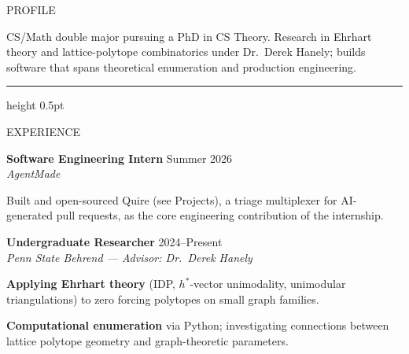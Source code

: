 \documentclass[10pt,letterpaper]{article}
\newcommand{\sechead}[1]{{\spacedboldfont\color{darktext}\fontsize{9.5}{11}\selectfont #1}\par\vspace{5pt}}
\newcommand{\subhead}[1]{{\bfseries\color{darktext}\fontsize{9.5}{12}\selectfont #1}}
\begin{document}
\newsavebox{\maincolbox}
\newlength{\maincolht}

\begin{lrbox}{\maincolbox}
\begin{minipage}[t]{5.55in}
\vspace{9pt}
\hspace{18pt}%
\begin{minipage}[t]{5.05in}

\sechead{PROFILE}
{\RaggedRight\fontsize{9}{13.5}\selectfont\color{darktext}
CS/Math double major pursuing a PhD in CS Theory. Research in Ehrhart theory and lattice-polytope combinatorics under Dr.\ Derek Hanely; builds software that spans theoretical enumeration and production engineering.\par}

\vspace{9pt}
{\color{lightrule}\hrule height 0.5pt}
\vspace{9pt}

\sechead{EXPERIENCE}

\subhead{Software Engineering Intern} \hfill {\fontsize{8.5}{10}\selectfont\color{midgray} Summer 2026}\\
{\fontsize{8.7}{11.5}\selectfont\color{midgray}\textit{AgentMade}}
\begin{tightlist}
\item {\fontsize{8.8}{12.3}\selectfont\color{darktext} Built and open-sourced Quire (see Projects), a triage multiplexer for AI-generated pull requests, as the core engineering contribution of the internship.}
\end{tightlist}

\vspace{10pt}
\subhead{Undergraduate Researcher} \hfill {\fontsize{8.5}{10}\selectfont\color{midgray} 2024--Present}\\
{\fontsize{8.7}{11.5}\selectfont\color{midgray}\textit{Penn State Behrend --- Advisor: Dr.\ Derek Hanely}}
\begin{tightlist}
\item {\fontsize{8.8}{12.3}\selectfont\color{darktext} \textbf{Applying Ehrhart theory} (IDP, $h^*$-vector unimodality, unimodular triangulations) to zero forcing polytopes on small graph families.}
\item {\fontsize{8.8}{12.3}\selectfont\color{darktext} \textbf{Computational enumeration} via Python; investigating connections between lattice polytope geometry and graph-theoretic parameters.}
\end{tightlist}


\end{minipage}
\end{minipage}
\end{lrbox}
\end{document}
